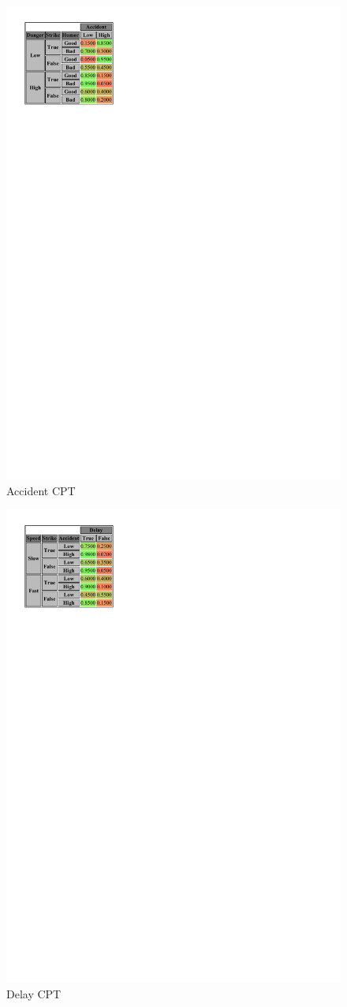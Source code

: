 \documentclass[a4paper,12pt]{article} %
\begin{document}
\begin{figure}[H]
	\centering
	\includegraphics[width=.6\linewidth]{../code/accident.pdf}	
	\caption{Accident CPT}
	\label{fig:accident}
\end{figure}

\begin{figure}[H]
	\centering
	\includegraphics[width=.6\linewidth]{../code/delay.pdf}	
	\caption{Delay CPT}
	\label{fig:delay}
\end{figure}
\end{document}
